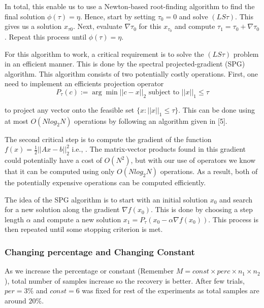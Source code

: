 \documentclass{article}
\begin{document}
In total, this enable us to use a Newton-based root-finding algorithm to find
the final solution $\phi(\tau) = \eta $. Hence, start by setting $\tau_{0} = 0 $ and solve $(LS \tau)$.
This gives us a solution $x_{\tau0}$. Next, evaluate $\nabla \tau_0$ for this
$x_{\tau_0}$ and compute $\tau_1 = \tau_0 + \nabla \tau_0$. Repeat this process until $\phi(\tau) = \eta $.

For this algorithm to work, a critical requirement is to solve the $(LS\tau)$
problem in an efficient manner. This is done by the spectral projected-gradient (SPG) algorithm. This algorithm consists of two potentially costly operations. First, one need to implement an efficients projection operator
\begin{equation}
    P_{\tau}(c) :={ \arg \min ||c-x||_{2} \text{ subject to } ||x||_1 \leq \tau } 
\end{equation}

to project any vector onto the feasible set $\{x: ||x||_1 \leq \tau \}$. This can be done
using at most $O(Nlog_2N)$ operations by following an algorithm given in [5].

The second critical step is to compute the gradient of the function $f(x) = \frac{1}{2}||Ax-b||^2_2$
i.e., . The matrix-vector products found
in this gradient could potentially have a cost of $O(N^2)$, but with our use of
operators we know that it can be computed using only $O(N log_2 N)$ operations.
As a result, both of the potentially expensive operations can be computed
efficiently.

The idea of the SPG algorithm is to start with an initial solution $x_0$ and
search for a new solution along the gradient $\nabla  f(x_0)$. This is done by choosing
a step length $\alpha$ and compute a new solution $x_1 = P_{\tau}(x_0 - \alpha \nabla f(x_0) ) $. This
process is then repeated until some stopping criterion is met.

\subsubsection{Changing percentage and Changing Constant} 
As we increase the percentage or constant (Remember  $M = const \times perc \times n_1 \times n_2$ ), total number of samples increase so the recovery is better. After few trials, $per = 3 \%$ and $const = 6$ was fixed for rest of the experiments as total samples are around $20 \%$.
\end{document}
